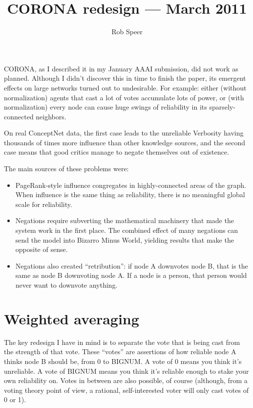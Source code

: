 \documentclass{article}
\title{CORONA redesign --- March 2011}
\author{Rob Speer}
\begin{document}
\maketitle

CORONA, as I described it in my January AAAI submission, did not work as
planned. Although I didn't discover this in time to finish the paper, its
emergent effects on large networks turned out to undesirable.  For example:
either (without normalization) agents that cast a lot of votes accumulate lots
of power, or (with normalization) every node can cause huge swings of
reliability in its sparsely-connected neighbors.

On real ConceptNet data, the first case leads to the unreliable Verbosity
having thousands of times more influence than other knowledge sources, and the
second case means that good critics manage to negate themselves out of
existence.

The main sources of these problems were:
\begin{itemize}
\item PageRank-style influence congregates in highly-connected areas of the
  graph. When influence is the same thing as reliability, there is no
  meaningful global scale for reliability.
\item Negations require subverting the mathematical machinery that made the
  system work in the first place. The combined effect of many negations can
  send the model into Bizarro Minus World, yielding results that make the
  opposite of sense.
\item Negations also created ``retribution'': if node A downvotes node B, that is the
  same as node B downvoting node A. If a node is a person, that person would
  never want to downvote anything.
\end{itemize}
\section{Weighted averaging}

The key redesign I have in mind is to separate the vote that is being cast from
the strength of that vote. These ``votes'' are assertions of how reliable node A
thinks node B should be, from 0 to BIGNUM. A vote of 0 means you think it's
unreliable. A vote of BIGNUM means you think it's reliable enough to stake your
own reliability on. Votes in between are also possible, of course 
(although, from a voting theory point of
view, a rational, self-interested voter will only cast votes of 0 or 1).
\end{document}
